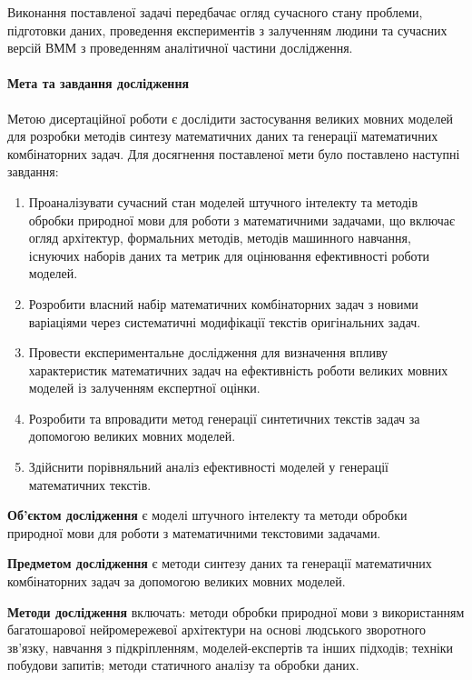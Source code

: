 Виконання поставленої задачі передбачає огляд сучасного стану проблеми, підготовки даних, проведення експериментів з залученням людини та сучасних версій ВММ з проведенням аналітичної частини дослідження.

\paragraph{Мета та завдання дослідження}
Метою дисертаційної роботи є дослідити застосування великих мовних моделей для розробки методів синтезу математичних даних та генерації математичних комбінаторних задач.
Для досягнення поставленої мети було поставлено наступні завдання:

\begin{enumerate}
    \item Проаналізувати сучасний стан моделей штучного інтелекту та методів обробки природної мови для роботи з математичними задачами, що включає огляд архітектур, формальних методів, методів машинного навчання, існуючих наборів даних та метрик для оцінювання ефективності роботи моделей.
    \item Розробити власний набір математичних комбінаторних задач з новими варіаціями через систематичні модифікації текстів оригінальних задач.
    \item Провести експериментальне дослідження для визначення впливу характеристик математичних задач на ефективність роботи великих мовних моделей із залученням експертної оцінки.
    \item Розробити та впровадити метод генерації синтетичних текстів задач за допомогою великих мовних моделей.
    \item Здійснити порівняльний аналіз ефективності моделей у генерації математичних текстів.
\end{enumerate}

\textbf{Об'єктом дослідження} є моделі штучного інтелекту та методи обробки природної мови для роботи з математичними текстовими задачами.
\medskip

\textbf{Предметом дослідження} є методи синтезу даних та генерації математичних комбінаторних задач за допомогою великих мовних моделей.
\medskip

\textbf{Методи дослідження} включать: методи обробки природної мови з використанням багатошарової нейромережевої архітектури на основі людського зворотного зв’язку, навчання з підкріпленням, моделей-експертів та інших підходів; техніки побудови запитів; методи статичного аналізу та обробки даних.

